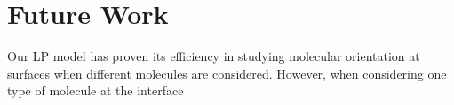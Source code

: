 \section{Future Work}
Our LP model has proven its efficiency in studying molecular orientation at surfaces when different molecules are considered. However, when considering one type of molecule at the interface







